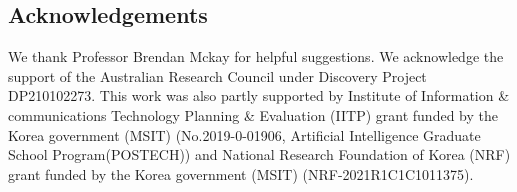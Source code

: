 \documentclass[nohyperref]{article}
\begin{document}

\printAffiliationsAndNotice{}









%


\subsection*{Acknowledgements}
We thank Professor Brendan Mckay for helpful suggestions. We acknowledge the support of the Australian Research Council under Discovery Project DP210102273. This work was also partly supported by Institute of Information \& communications Technology Planning \& Evaluation (IITP) grant funded by the Korea government (MSIT) (No.2019-0-01906, Artificial Intelligence Graduate School Program(POSTECH)) and National Research Foundation of Korea (NRF) grant funded by the Korea government (MSIT) (NRF-2021R1C1C1011375).





\newpage
\appendix
\onecolumn

\end{document}
